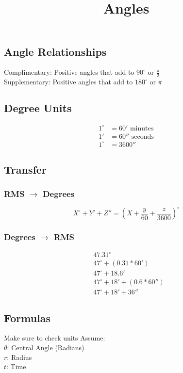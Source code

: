 \documentclass{article}
\title{Angles}
\author{}
\date{}
\newcommand{\ra}{$\rightarrow$ }
\newcommand{\de}{^\circ}
\begin{document}
	\maketitle{}
	
	\subsection{Angle Relationships}
	Complimentary: Positive angles that add to $90^\circ$ or $\frac{\pi}{2}$ \\
	Supplementary: Positive angles that add to $180^\circ$ or $\pi$
	
	\subsection{Degree Units}
	\begin{align*}
		1\de &= 60'  \text{ minutes} \\
		1' &= 60'' \text{ seconds} \\
		1\de &= 3600 ''
	\end{align*}
	\subsection{Transfer}
	\subsubsection{RMS \ra Degrees}
	\begin{equation*}
		X^\circ + Y' + Z'' = (X 
		+ \frac{y}{60} + \frac{z}{3600})\de
	\end{equation*}
	\subsubsection{Degrees \ra RMS}
	\begin{align*}
		& 47.31\de \\
		& 47\de + (0.31 * 60') \\
		& 47\de + 18.6' \\
		& 47\de + 18' + (0.6 * 60'') \\
		& 47\de + 18' + 36''
	\end{align*}
	
	\subsection{Formulas}
	Make sure to check units
	Assume: \\
	\indent $\theta$: Central Angle (Radians) \\
	\indent $r$: Radius \\
	\indent $t$: Time
	
\end{document}
